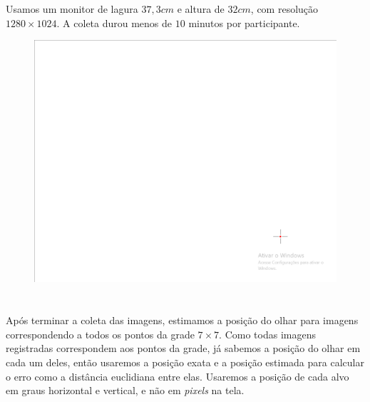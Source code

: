 Usamos um monitor de lagura $37,3cm$ e altura de $32cm$, com resolução $1280 \times 1024$. A coleta durou menos de $10$ minutos por participante.

\begin{figure}
\centering
\includegraphics[scale=1]{imagens/alvo.png}
\caption{ }
\label{fig:alvo}
\end{figure}

\section{}

Após terminar a coleta das imagens, estimamos a posição do olhar para imagens correspondendo a todos os pontos da grade $7 \times 7$. Como todas imagens registradas correspondem aos pontos da grade, já sabemos a posição do olhar em cada um deles, então usaremos a posição exata e a posição estimada para calcular o erro como a distância euclidiana entre elas. Usaremos a posição de cada alvo em graus horizontal e vertical, e não em \textit{pixels} na tela.

